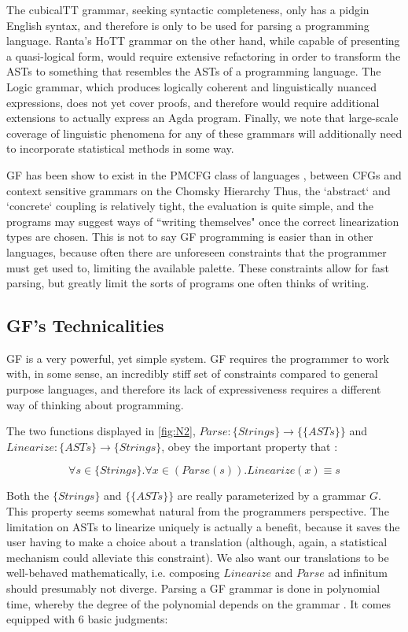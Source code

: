 The cubicalTT grammar, seeking syntactic completeness, only has a pidgin
English syntax, and therefore is only to be used for parsing a programming language.
Ranta's HoTT grammar on the other hand, while capable of presenting a
quasi-logical form, would require extensive refactoring in order to transform
the ASTs to something that resembles the ASTs of a programming language. The
Logic grammar, which produces logically coherent and linguistically nuanced
expressions, does not yet cover proofs, and therefore would require additional extensions
to actually express an Agda program. Finally, we note that large-scale
coverage of linguistic phenomena for any of these grammars will additionally
need to incorporate statistical methods in some way. 

GF has been show to exist in the PMCFG class of languages \cite{seki91pmcfg},
between CFGs and context sensitive grammars on the Chomsky Hierarchy
\cite{chomsky1956hierarchy} Thus, the `abstract` and `concrete` coupling is
relatively tight, the evaluation is quite simple, and the programs may suggest
ways of ``writing themselves" once the correct linearization types are chosen.
This is not to say GF programming is easier than in other languages, because
often there are unforeseen constraints that the programmer must get used to,
limiting the available palette. These constraints allow for fast parsing, but
greatly limit the sorts of programs one often thinks of writing.

\subsection{GF's Technicalities}

GF is a very powerful, yet simple system. GF requires the programmer to work
with, in some sense, an incredibly stiff set of constraints compared to general
purpose languages, and therefore its lack of expressiveness requires a different
way of thinking about programming.

The two functions displayed in \autoref{fig:N2}, $Parse : \{Strings\}
\rightarrow \{\{ASTs\}\}$ and $Linearize : \{ASTs\} \rightarrow \{Strings\}$, obey
the important property that :

 $$\forall s \in \{Strings\}. \forall x \in (Parse(s)). Linearize(x) \equiv s$$

Both the $\{Strings\}$ and $\{\{ASTs\}\}$ are really parameterized by a grammar
$G$. This property seems somewhat natural from the programmers perspective. The
limitation on ASTs to linearize uniquely is actually a benefit, because it saves
the user having to make a choice about a translation (although, again, a
statistical mechanism could alleviate this constraint). We also want our
translations to be well-behaved mathematically, i.e. composing $Linearize$ and
$Parse$ ad infinitum should presumably not diverge. Parsing a GF grammar is done
in polynomial time, whereby the degree of the polynomial depends on the grammar
\cite{angelov2010phd} . It comes equipped with 6 basic judgments:

